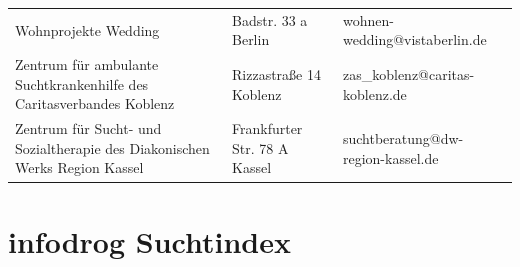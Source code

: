 {\begin{xltabular}{\textwidth} {
 >{\raggedright\arraybackslash}p{5cm}
 >{\raggedright\arraybackslash}X
 >{\raggedright\arraybackslash}p{5cm} }
Wohnprojekte Wedding & Badstr. 33 a Berlin & wohnen-wedding@vistaberlin.de \\
Zentrum für ambulante Suchtkrankenhilfe des Caritasverbandes Koblenz & Rizzastraße 14 Koblenz & zas\_koblenz@caritas-koblenz.de \\
Zentrum für Sucht- und Sozialtherapie des Diakonischen Werks Region Kassel & Frankfurter Str. 78 A Kassel & suchtberatung@dw-region-kassel.de \\
\bottomrule
\end{xltabular}
}

\section{infodrog Suchtindex}
